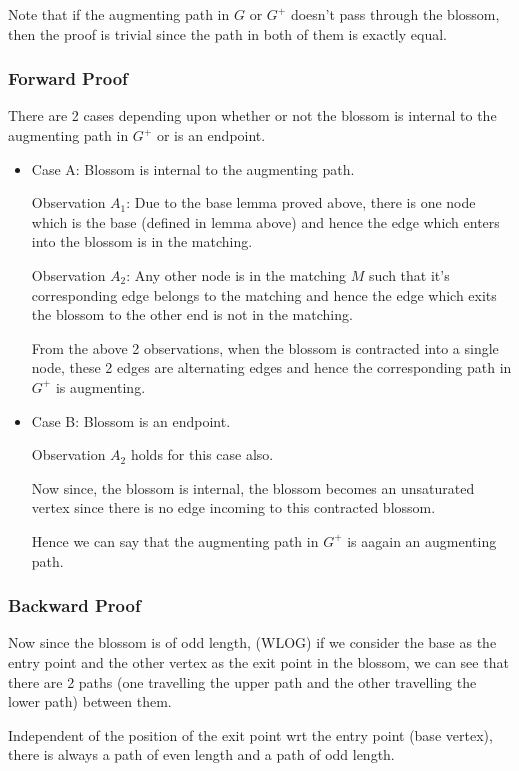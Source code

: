 Note that if the augmenting path in $G$ or $G^+$ doesn't pass through the blossom, then the proof is trivial since the path in both of them is exactly equal.

\subsubsection{Forward Proof}
There are 2 cases depending upon whether or not the blossom is internal to the augmenting path in $G^+$ or is an endpoint.
\begin{itemize}
    \item Case A: Blossom is internal to the augmenting path. 
        
        Observation $A_1$: Due to the base lemma proved above, there is one node which is the base (defined in lemma above) and hence the edge which enters into the blossom is in the matching.
        
        Observation $A_2$: Any other node is in the matching $M$ such that it's corresponding edge belongs to the matching and hence the edge which exits the blossom to the other end is not in the matching.
        
        From the above 2 observations, when the blossom is contracted into a single node, these 2 edges are alternating edges and hence the corresponding path in $G^+$ is augmenting.
    \item Case B: Blossom is an endpoint.
        
        Observation $A_2$ holds for this case also.
        
        Now since, the blossom is internal, the blossom becomes an unsaturated vertex since there is no edge incoming to this contracted blossom. 
        
        Hence we can say that the augmenting path in $G^+$ is aagain an augmenting path.
        
\end{itemize}


\subsubsection{Backward Proof}
Now since the blossom is of odd length, (WLOG) if we consider the base as the entry point and the other vertex as the exit point in the blossom, we can see that there are 2 paths (one travelling the upper path and the other travelling the lower path) between them. 

Independent of the position of the exit point wrt the entry point (base vertex), there is always a path of even length and a path of odd length. 

